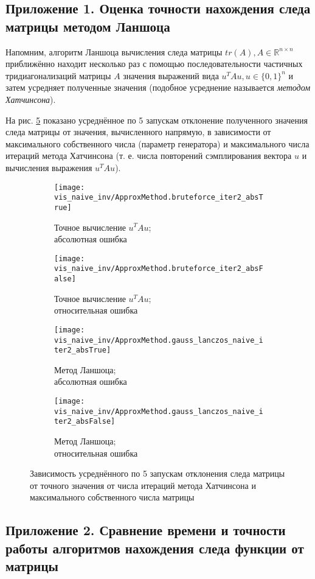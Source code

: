 \subsection{Приложение 1. Оценка точности нахождения следа матрицы методом Ланшоца }\label{appendix:lanczosAccuracy}

Напомним, алгоритм Ланшоца вычисления следа матрицы $ tr(A), A \in \mathds R^{n \times n} $ приближённо находит несколько раз с помощью последовательности частичных тридиагонализаций матрицы $A$ значения выражений вида $ u^T Au, u \in \{0, 1\} ^n $ и затем усредняет полученные значения (подобное усреднение называется \emph{методом Хатчинсона}).

На рис. \ref{fig:trace_deviation} показано усреднённое по 5 запускам отклонение полученного значения следа матрицы от значения, вычисленного напрямую, в зависимости от максимального собственного числа (параметр генератора) и максимального числа итераций метода Хатчинсона (т. е. числа повторений сэмплирования вектора $ u $ и вычисления выражения $ u^T A u $).

\begin{figure}[H]
    \captionsetup[subfigure]{justification=centering}
    \centering
    \begin{subfigure}{.5\textwidth}
        \centering
        \texttt{[image: vis\_naive\_inv/ApproxMethod.bruteforce\_iter2\_absTrue]}
        \caption{Точное вычисление $ u^TAu $; \\ абсолютная ошибка}
        \label{fig:trdev_brut_abs}
    \end{subfigure}%
    \begin{subfigure}{.5\textwidth}
        \centering
        \texttt{[image: vis\_naive\_inv/ApproxMethod.bruteforce\_iter2\_absFalse]}
        \caption{Точное вычисление $ u^TAu $; \\ относительная ошибка}
        \label{fig:trdev_brut_rel}
    \end{subfigure}

    \begin{subfigure}{.5\textwidth}
        \centering
        \texttt{[image: vis\_naive\_inv/ApproxMethod.gauss\_lanczos\_naive\_iter2\_absTrue]}
        \caption{Метод Ланшоца; \\ абсолютная ошибка}
        \label{fig:trdev_lanc_abs}
    \end{subfigure}%
    \begin{subfigure}{.5\textwidth}
        \centering
        \texttt{[image: vis\_naive\_inv/ApproxMethod.gauss\_lanczos\_naive\_iter2\_absFalse]}
        \caption{Метод Ланшоца; \\ относительная ошибка}
        \label{fig:trdev_lanc_rel}
    \end{subfigure}
    \caption{ Зависимость усреднённого по 5 запускам отклонения следа матрицы от точного значения от числа итераций метода Хатчинсона и максимального собственного числа матрицы }
    \label{fig:trace_deviation}
\end{figure}

\newpage
\subsection{Приложение 2. Сравнение времени и точности работы алгоритмов нахождения следа функции от матрицы }
\label{appendix:benchmark}


